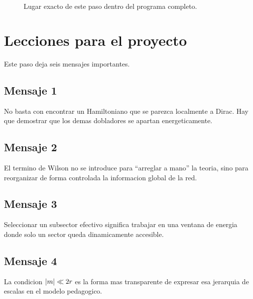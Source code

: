 \begin{figure}[h!]
\centering
{}
\caption{Lugar exacto de este paso dentro del programa completo.}
\end{figure}

\section{Lecciones para el proyecto}
Este paso deja seis mensajes importantes.

\subsection*{Mensaje 1}
No basta con encontrar un Hamiltoniano que se parezca localmente a Dirac. Hay que demostrar que los demas dobladores se apartan energeticamente.

\subsection*{Mensaje 2}
El termino de Wilson no se introduce para \enquote{arreglar a mano} la teoria, sino para reorganizar de forma controlada la informacion global de la red.

\subsection*{Mensaje 3}
Seleccionar un subsector efectivo significa trabajar en una ventana de energia donde solo un sector queda dinamicamente accesible.

\subsection*{Mensaje 4}
La condicion \(\abs{m}\ll 2r\) es la forma mas transparente de expresar esa jerarquia de escalas en el modelo pedagogico.


